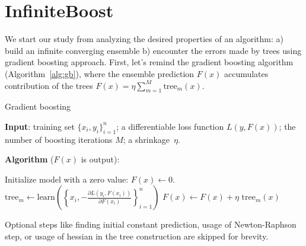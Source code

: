 \section{InfiniteBoost}
We start our study from analyzing the desired properties of an algorithm:
a) build an infinite converging ensemble b) encounter the errors made by trees using gradient boosting approach. First, let's remind the gradient boosting algorithm (Algorithm~\ref{alg:gb}),
where the ensemble prediction $F(x)$ accumulates contribution of the trees $ F(x) = \eta \sum_{m=1}^M \text{tree}_m(x) $.

\begin{algorithm}[!h]
  \caption{Gradient boosting}\label{alg:gb}
  {\bf Input}: training set $\{x_i, y_i\}_{i=1}^n$; a differentiable loss function $L(y, F(x))$; the number of boosting iterations $M$; a shrinkage~$\eta$.

  {\bf Algorithm} ($F(x)$ is output):
  \begin{algorithmic}
    \State Initialize model with a zero value: $F(x) \gets 0$.
      \State $\text{tree}_m \gets \text{learn}\left(\left\{x_i, -\frac{\partial L(y_i, F(x_i))}{\partial F(x_i)}\right\}_{i=1}^n\right)$
      \State $F(x) \gets F(x) + \eta \text{ tree}_m(x)$
    \EndFor
  \end{algorithmic}

  Optional steps like finding initial constant prediction, usage of Newton-Raphson step,
  or usage of hessian in the tree construction are skipped for brevity.
\end{algorithm}

